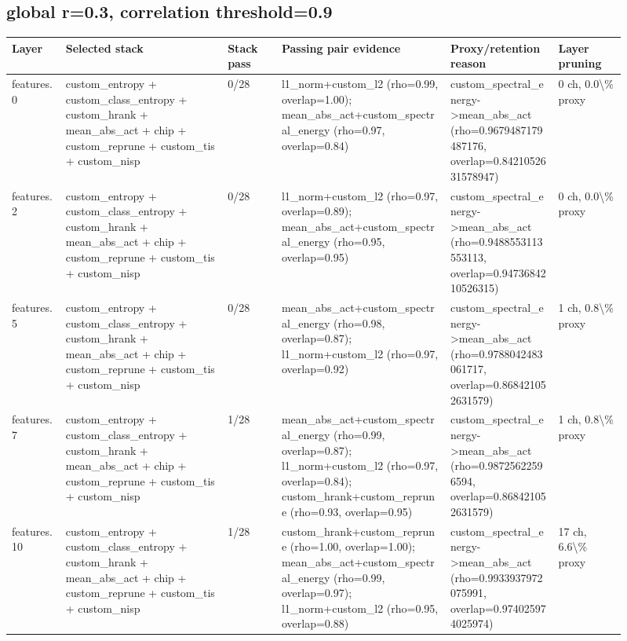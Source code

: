 \documentclass[10pt]{article}
\begin{document}
\subsection*{global r=0.3, correlation threshold=0.9}
\scriptsize
\begin{longtable}{p{0.08\linewidth}p{0.24\linewidth}p{0.08\linewidth}p{0.25\linewidth}p{0.16\linewidth}p{0.10\linewidth}}
\toprule
Layer & Selected stack & Stack pass & Passing pair evidence & Proxy/retention reason & Layer pruning \\
\midrule
\endhead
features.0 & custom\_entropy + custom\_class\_entropy + custom\_hrank + mean\_abs\_act + chip + custom\_reprune + custom\_tis + custom\_nisp & 0/28 & l1\_norm+custom\_l2 (rho=0.99, overlap=1.00); mean\_abs\_act+custom\_spectral\_energy (rho=0.97, overlap=0.84) & custom\_spectral\_energy->mean\_abs\_act (rho=0.9679487179487176, overlap=0.8421052631578947) & 0 ch, 0.0\textbackslash{}\% proxy \\
features.2 & custom\_entropy + custom\_class\_entropy + custom\_hrank + mean\_abs\_act + chip + custom\_reprune + custom\_tis + custom\_nisp & 0/28 & l1\_norm+custom\_l2 (rho=0.97, overlap=0.89); mean\_abs\_act+custom\_spectral\_energy (rho=0.95, overlap=0.95) & custom\_spectral\_energy->mean\_abs\_act (rho=0.9488553113553113, overlap=0.9473684210526315) & 0 ch, 0.0\textbackslash{}\% proxy \\
features.5 & custom\_entropy + custom\_class\_entropy + custom\_hrank + mean\_abs\_act + chip + custom\_reprune + custom\_tis + custom\_nisp & 0/28 & mean\_abs\_act+custom\_spectral\_energy (rho=0.98, overlap=0.87); l1\_norm+custom\_l2 (rho=0.97, overlap=0.92) & custom\_spectral\_energy->mean\_abs\_act (rho=0.9788042483061717, overlap=0.868421052631579) & 1 ch, 0.8\textbackslash{}\% proxy \\
features.7 & custom\_entropy + custom\_class\_entropy + custom\_hrank + mean\_abs\_act + chip + custom\_reprune + custom\_tis + custom\_nisp & 1/28 & mean\_abs\_act+custom\_spectral\_energy (rho=0.99, overlap=0.87); l1\_norm+custom\_l2 (rho=0.97, overlap=0.84); custom\_hrank+custom\_reprune (rho=0.93, overlap=0.95) & custom\_spectral\_energy->mean\_abs\_act (rho=0.98725622596594, overlap=0.868421052631579) & 1 ch, 0.8\textbackslash{}\% proxy \\
features.10 & custom\_entropy + custom\_class\_entropy + custom\_hrank + mean\_abs\_act + chip + custom\_reprune + custom\_tis + custom\_nisp & 1/28 & custom\_hrank+custom\_reprune (rho=1.00, overlap=1.00); mean\_abs\_act+custom\_spectral\_energy (rho=0.99, overlap=0.97); l1\_norm+custom\_l2 (rho=0.95, overlap=0.88) & custom\_spectral\_energy->mean\_abs\_act (rho=0.9933937972075991, overlap=0.974025974025974) & 17 ch, 6.6\textbackslash{}\% proxy \\

\end{longtable}
\end{document}
